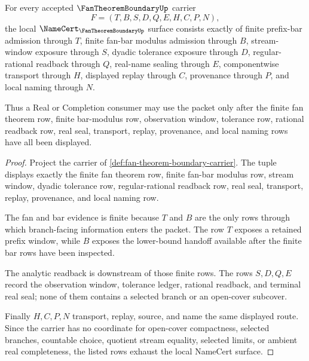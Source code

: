 \begin{theorem}
\label{thm:fan-theorem-boundary-namecert-obligations}
For every accepted $\FanTheoremBoundaryUp$ carrier
$$
F=(T,B,S,D,Q,E,H,C,P,N),
$$
the local $\NameCert_{\FanTheoremBoundaryUp}$ surface consists exactly of finite prefix-bar admission through $T$, finite fan-bar modulus admission through $B$, stream-window exposure through $S$, dyadic tolerance exposure through $D$, regular-rational readback through $Q$, real-name sealing through $E$, componentwise transport through $H$, displayed replay through $C$, provenance through $P$, and local naming through $N$.

Thus a Real or Completion consumer may use the packet only after the finite fan theorem row, finite bar-modulus row, observation window, tolerance row, rational readback row, real seal, transport, replay, provenance, and local naming rows have all been displayed.
\end{theorem}
\begin{proof}
Project the carrier of \autoref{def:fan-theorem-boundary-carrier}. The tuple displays exactly the finite fan theorem row, finite fan-bar modulus row, stream window, dyadic tolerance row, regular-rational readback row, real seal, transport, replay, provenance, and local naming row.

The fan and bar evidence is finite because $T$ and $B$ are the only rows through which branch-facing information enters the packet. The row $T$ exposes a retained prefix window, while $B$ exposes the lower-bound handoff available after the finite bar rows have been inspected.

The analytic readback is downstream of those finite rows. The rows $S,D,Q,E$ record the observation window, tolerance ledger, rational readback, and terminal real seal; none of them contains a selected branch or an open-cover subcover.

Finally $H,C,P,N$ transport, replay, source, and name the same displayed route. Since the carrier has no coordinate for open-cover compactness, selected branches, countable choice, quotient stream equality, selected limits, or ambient real completeness, the listed rows exhaust the local NameCert surface.
\end{proof}

